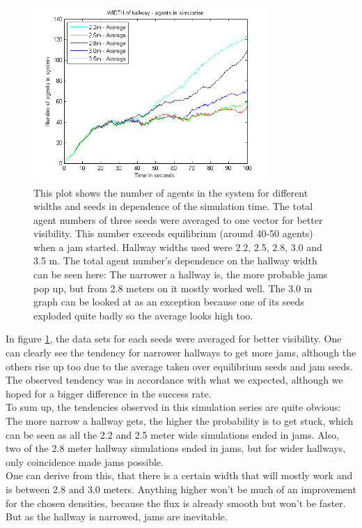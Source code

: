 \begin{figure}[h!]
	\centering
		\includegraphics[width=0.80\textwidth]{pictures/AAveragesInOne.png}
	\caption{This plot shows the number of agents in the system for different widths and seeds in dependence of the simulation time. The total agent numbers of three seeds were averaged to one vector for better visibility. This number exceeds equilibrium (around 40-50 agents) when a jam started.  Hallway widths used were 2.2, 2.5, 2.8, 3.0 and 3.5 m. The total agent number's dependence on the hallway width can be seen here: The narrower a hallway is, the more probable jams pop up, but from 2.8 meters on it mostly worked well. The 3.0 m graph can be looked at as an exception because one of its seeds exploded quite badly so the average looks high too.}
	\label{fig:AveragesInOne}
\end{figure}

\noi In figure \ref{fig:AveragesInOne}, the data sets for each seeds were averaged for better visibility. One can clearly see the tendency for narrower hallways to get more jams, although the others rise up too due to the average taken over equilibrium seeds and jam seeds.\\

\noi The observed tendency was in accordance with what we expected, although we hoped for a bigger difference in the success rate.\\

To sum up, the tendencies observed in this simulation series are quite obvious: The more narrow a hallway gets, the higher the probability is to get stuck, which can be seen as all the 2.2 and 2.5 meter wide simulations ended in jams. Also, two of the 2.8 meter hallway simulations ended in jams, but for wider hallways, only coincidence made jams possible.\\
One can derive from this, that there is a certain width that will mostly work and is between 2.8 and 3.0 meters. Anything higher won't be much of an improvement for the chosen densities, because the flux is already smooth but won't be faster. But as the hallway is narrowed, jams are inevitable.\\
